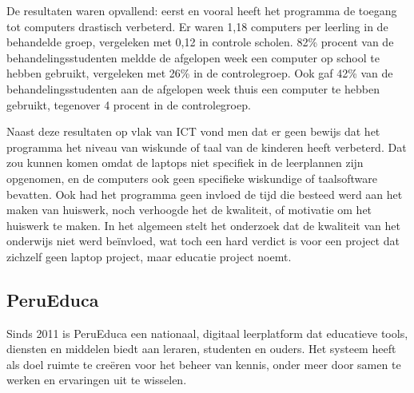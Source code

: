 De resultaten waren opvallend: eerst en vooral heeft het programma de toegang tot computers drastisch verbeterd. Er waren 1,18 computers per leerling in de behandelde groep, vergeleken met 0,12 in controle scholen. 82\% procent van de behandelingsstudenten meldde de afgelopen week een computer op school te hebben gebruikt, vergeleken met 26\% in de controlegroep. Ook gaf 42\% van de behandelingsstudenten aan de afgelopen week thuis een computer te hebben gebruikt, tegenover 4 procent in de controlegroep. \autocite{Ibarraran2012}

Naast deze resultaten op vlak van ICT vond men dat er geen bewijs dat het programma het niveau van wiskunde of taal van de kinderen heeft verbeterd. Dat zou kunnen komen omdat de laptops niet specifiek in de leerplannen zijn opgenomen, en de computers ook geen specifieke wiskundige of taalsoftware bevatten. Ook had het programma geen invloed de tijd die besteed werd aan het maken van huiswerk, noch verhoogde het de kwaliteit, of motivatie om het huiswerk te maken. In het algemeen stelt het onderzoek dat de kwaliteit van het onderwijs niet werd beïnvloed, wat toch een hard verdict is voor een project dat zichzelf geen laptop project, maar educatie project noemt. \autocite{Ibarraran2012}

\subsection{PeruEduca}
Sinds 2011 is PeruEduca een nationaal, digitaal leerplatform dat educatieve tools, diensten en middelen biedt aan leraren, studenten en ouders. Het systeem heeft als doel ruimte te creëren voor het beheer van kennis, onder meer door samen te werken en ervaringen uit te wisselen. \autocite{EducationPeru2020}

